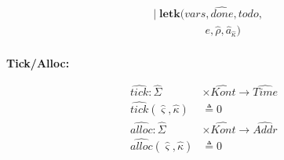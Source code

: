 \documentclass[12pt,draft]{article}
\begin{document}
\begin{multicols*}{2}
\begin{align*}
    &|\; \textbf{letk}(vars, \widehat{done}, todo, \\
    &\;\;\;\;\;\;\;\;\;\;\;\;\;\;\;\;\;e, \hat{\rho}, \hat{a}_{\hat\kappa}) \\
  \end{align*}
  \begin{center}
    \textbf{Tick/Alloc:}
  \end{center}
  \vspace{-7mm}
  \begin{align*}
    \widehat{tick}:\widehat{\Sigma}
    &\times \widehat{\textit{Kont}} \rightarrow \widehat{\textit{Time}} \\
    \widehat{tick}(\hat{\varsigma}, \hat{\kappa}) &\triangleq 0 \\
    \widehat{alloc}:\hat{\Sigma}
    &\times \widehat{\textit{Kont}} \rightarrow \widehat{\textit{Addr}} \\
    \widehat{alloc}(\hat{\varsigma}, \hat{\kappa}) &\triangleq 0 \\
  \end{align*}
\end{multicols*}



\newpage
\end{document}
